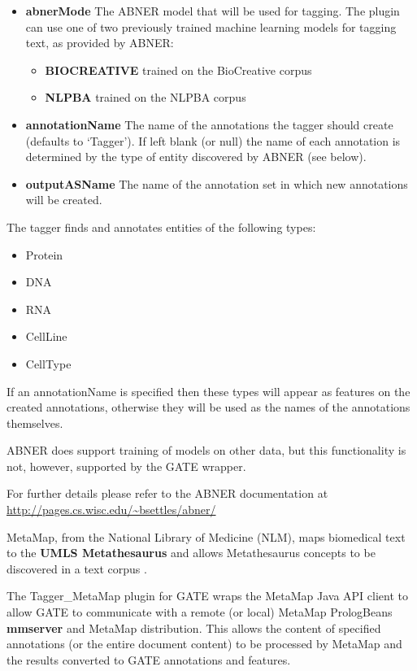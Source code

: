 \begin{itemize}
\item \textbf{abnerMode} The ABNER model that will be used for tagging. The
  plugin can use one of two previously trained machine learning models for
  tagging text, as provided by ABNER:
  \begin{itemize}
  \item \textbf{BIOCREATIVE} trained on the BioCreative corpus
  \item \textbf{NLPBA} trained on the NLPBA corpus
  \end{itemize}
\item \textbf{annotationName} The name of the annotations the tagger should create
  (defaults to `Tagger'). If left blank (or null) the name of each annotation is
  determined by the type of entity discovered by ABNER (see below).
\item \textbf{outputASName} The name of the annotation set in which new
  annotations will be created.
\end{itemize}

The tagger finds and annotates entities of the following types:
\begin{itemize}
\item Protein
\item DNA
\item RNA
\item CellLine
\item CellType
\end{itemize}

If an annotationName is specified then these types will appear as features on the
created annotations, otherwise they will be used as the names of the annotations themselves.

ABNER does support training of models on other data, but this functionality is
not, however, supported by the GATE wrapper.

For further details please refer to the ABNER documentation at
\url{http://pages.cs.wisc.edu/~bsettles/abner/}


MetaMap, from the National Library of Medicine (NLM), maps biomedical text to 
the \textbf{UMLS Metathesaurus} and allows Metathesaurus concepts to be 
discovered in a text corpus \cite{Aronson10}.

The Tagger\_MetaMap plugin for GATE wraps the MetaMap Java API client to allow GATE to communicate with a remote (or local) MetaMap PrologBeans \textbf{mmserver} and MetaMap distribution. This allows the content of specified annotations (or the entire document content) to be processed by MetaMap and the results converted to GATE annotations and features.

